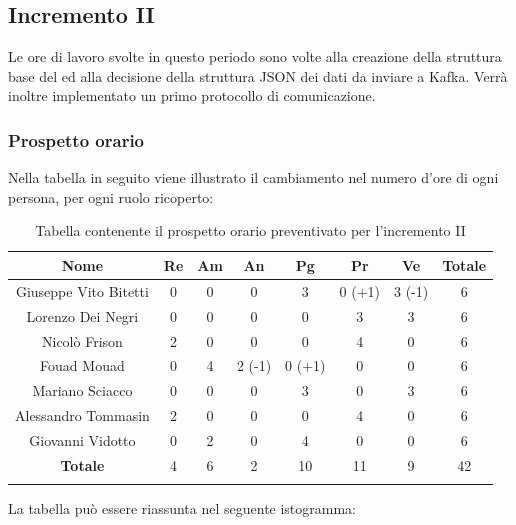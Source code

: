 		\subsection{Incremento II }
		Le ore di lavoro svolte in questo periodo sono volte alla creazione della struttura base del  ed alla decisione della struttura JSON dei dati da inviare a Kafka. Verrà inoltre implementato un primo protocollo di comunicazione.
		\subsubsection{Prospetto orario}
			Nella tabella in seguito viene illustrato il cambiamento nel numero d'ore di ogni persona, per ogni ruolo ricoperto:
			
			\begin{longtable}{|c|c|c|c|c|c|c|c}
				\hline
				\rowcolor{lighter-grayer}
				\textbf{Nome} & \textbf{Re} & \textbf{Am} & \textbf{An} & \textbf{Pg}  & \textbf{Pr}   & \textbf{Ve} & \textbf{Totale} \\
				\hline
				\endfirsthead
				\hline
				Giuseppe Vito Bitetti & 0 & 0 & 0 & 3 & 0 (+1) & 3 (-1) & 6\\
				\hline
				\hline
				Lorenzo Dei Negri & 0 & 0 & 0 & 0 & 3 & 3 & 6 \\
				\hline
				\hline
				Nicolò Frison & 2 & 0 & 0 & 0 & 4 & 0 & 6 \\
				\hline
				\hline
				Fouad Mouad & 0 & 4 & 2 (-1) & 0 (+1) & 0 & 0 & 6 \\
				\hline
				\hline
				Mariano Sciacco & 0 & 0 & 0 & 3 & 0 & 3 & 6 \\
				\hline
				\hline
				Alessandro Tommasin & 2 & 0 & 0 & 0 & 4 & 0 & 6 \\
				\hline
				\hline
				Giovanni Vidotto & 0 & 2 & 0 & 4 & 0 & 0 & 6\\
				\hline 
				\textbf{Totale} & 4 &  6 & 2 & 10 & 11 & 9 & 42\\
				\hline 
				
				\caption{Tabella contenente il prospetto orario preventivato per l'incremento II}
			\end{longtable}
			\pagebreak	
			
			La tabella può essere riassunta nel seguente istogramma:
			
